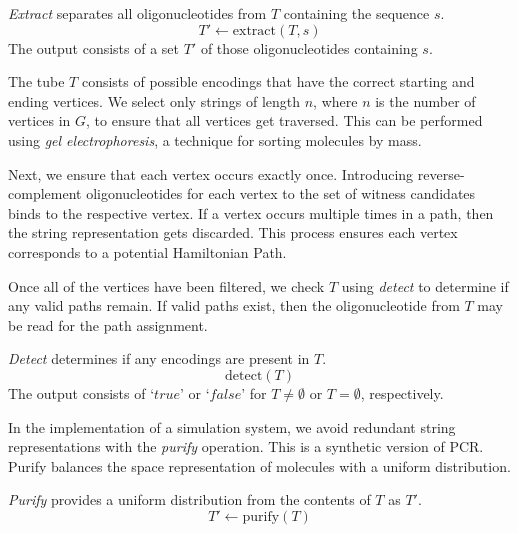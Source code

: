 \begin{definition}
\emph{Extract} separates all oligonucleotides from $T$ containing the sequence $s$.
\[
T' \leftarrow \mathrm{extract}( T, s)
\]
The output consists of a set $T'$ of those oligonucleotides containing $s$.
\end{definition}

The tube $T$ consists of possible encodings that have the correct starting and ending vertices. We select only strings of length $n$, where $n$ is the number of vertices in $G$, to ensure that all vertices get traversed.  This can be performed using \textit{gel electrophoresis}, a technique for sorting molecules by mass.

Next, we ensure that each vertex occurs exactly once.  Introducing reverse-complement oligonucleotides for each vertex to the set of witness candidates binds to the respective vertex.  If a vertex occurs multiple times in a path, then the string representation gets discarded.  This process ensures each vertex corresponds to a potential Hamiltonian Path.

Once all of the vertices have been filtered, we check $T$ using \textit{detect} to determine if any valid paths remain.  If valid paths exist, then the oligonucleotide from $T$ may be read for the path assignment.

\begin{definition}
\emph{Detect} determines if any encodings are present in $T$.  
\[
\mathrm{detect}( T)
\]
The output consists of `$true$' or `$false$' for $T \neq \emptyset$ or $T = \emptyset$, respectively.
\end{definition}

In the implementation of a simulation system, we avoid redundant string representations with the \textit{purify} operation.  This is a synthetic version of PCR.  Purify balances the space representation of molecules with a uniform distribution.

\begin{definition}
\emph{Purify} provides a uniform distribution from the contents of $T$ as $T'$.
\[
T' \leftarrow \mathrm{purify}(T)
\]
\end{definition}


	
